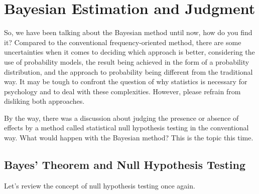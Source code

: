 \documentclass{ltjbook}
\begin{document}
\VerbatimFootnotes
\chapter{Bayesian Estimation and Judgment}
\label{m27_bayesian3}
So, we have been talking about the Bayesian method until now, how do you find it?
Compared to the conventional frequency-oriented method, there are some uncertainties when it comes to deciding which approach is better, considering the use of probability models, the result being achieved in the form of a probability distribution, and the approach to probability being different from the traditional way. It may be tough to confront the question of why statistics is necessary for psychology and to deal with these complexities. However, please refrain from disliking both approaches.

By the way, there was a discussion about judging the presence or absence of effects by a method called statistical null hypothesis testing in the conventional way. What would happen with the Bayesian method? This is the topic this time.

\section{Bayes' Theorem and Null Hypothesis Testing}
Let's review the concept of null hypothesis testing once again.
\end{document}

